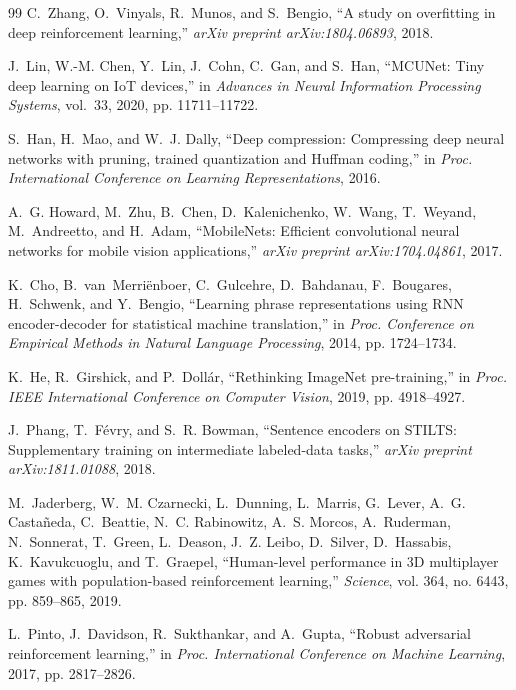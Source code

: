 \documentclass[conference]{IEEEtran}
\begin{document}
\begin{thebibliography}{99}
C.~Zhang, O.~Vinyals, R.~Munos, and S.~Bengio, ``A study on overfitting in deep reinforcement learning,'' \emph{arXiv preprint arXiv:1804.06893}, 2018.

J.~Lin, W.-M. Chen, Y.~Lin, J.~Cohn, C.~Gan, and S.~Han, ``MCUNet: Tiny deep learning on IoT devices,'' in \emph{Advances in Neural Information Processing Systems}, vol.~33, 2020, pp. 11711--11722.

S.~Han, H.~Mao, and W.~J. Dally, ``Deep compression: Compressing deep neural networks with pruning, trained quantization and Huffman coding,'' in \emph{Proc. International Conference on Learning Representations}, 2016.

A.~G. Howard, M.~Zhu, B.~Chen, D.~Kalenichenko, W.~Wang, T.~Weyand, M.~Andreetto, and H.~Adam, ``MobileNets: Efficient convolutional neural networks for mobile vision applications,'' \emph{arXiv preprint arXiv:1704.04861}, 2017.

K.~Cho, B.~van~Merri\"{e}nboer, C.~Gulcehre, D.~Bahdanau, F.~Bougares, H.~Schwenk, and Y.~Bengio, ``Learning phrase representations using RNN encoder-decoder for statistical machine translation,'' in \emph{Proc. Conference on Empirical Methods in Natural Language Processing}, 2014, pp. 1724--1734.

K.~He, R.~Girshick, and P.~Doll\'{a}r, ``Rethinking ImageNet pre-training,'' in \emph{Proc. IEEE International Conference on Computer Vision}, 2019, pp. 4918--4927.

J.~Phang, T.~F\'{e}vry, and S.~R. Bowman, ``Sentence encoders on STILTS: Supplementary training on intermediate labeled-data tasks,'' \emph{arXiv preprint arXiv:1811.01088}, 2018.

M.~Jaderberg, W.~M. Czarnecki, L.~Dunning, L.~Marris, G.~Lever, A.~G. Casta\~{n}eda, C.~Beattie, N.~C. Rabinowitz, A.~S. Morcos, A.~Ruderman, N.~Sonnerat, T.~Green, L.~Deason, J.~Z. Leibo, D.~Silver, D.~Hassabis, K.~Kavukcuoglu, and T.~Graepel, ``Human-level performance in 3D multiplayer games with population-based reinforcement learning,'' \emph{Science}, vol. 364, no. 6443, pp. 859--865, 2019.

L.~Pinto, J.~Davidson, R.~Sukthankar, and A.~Gupta, ``Robust adversarial reinforcement learning,'' in \emph{Proc. International Conference on Machine Learning}, 2017, pp. 2817--2826.

\end{thebibliography}
\end{document}
